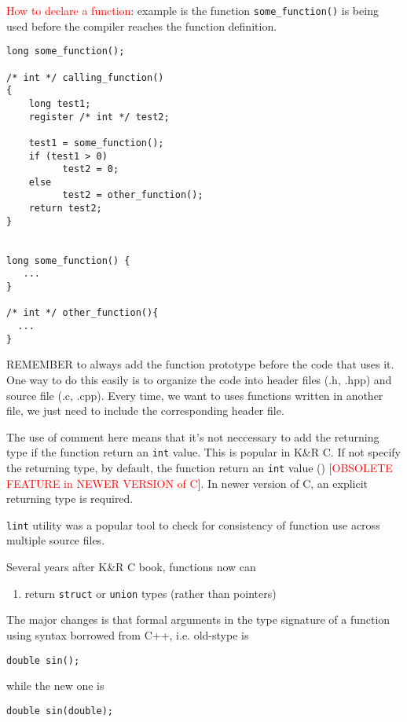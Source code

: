 \textcolor{red}{How to declare a function}: example is the function
\verb!some_function()! is being used before the compiler reaches the function
definition. 
\begin{lstlisting}
long some_function();

/* int */ calling_function()
{
    long test1;
    register /* int */ test2;
 
    test1 = some_function();
    if (test1 > 0)
          test2 = 0;
    else
          test2 = other_function();
    return test2;
}


long some_function() {
   ... 
}

/* int */ other_function(){
  ...
}
\end{lstlisting}
REMEMBER to always add the function prototype before the code that
uses it. One way to do this easily is to organize the code into header
files (.h, .hpp) and source file (.c, .cpp). Every time, we want to uses
functions written in another file, we just need to include the corresponding
header file.

The use of comment here means that it's not neccessary to add the returning type
if the function return an \verb!int! value. This is popular in K\&R C. If not
specify the returning type, by default, the function return an \verb!int! value
() [\textcolor{red}{OBSOLETE FEATURE in NEWER VERSION of C}].
In newer version of C, an explicit returning type is required.

\begin{mdframed}
\verb!lint! utility was a popular tool to check for consistency of function use
across multiple source files.
\end{mdframed}

Several years after K\&R C book, functions now can 
\begin{enumerate}
  \item return \verb!struct! or \verb!union! types (rather than pointers)
\end{enumerate}

The major changes is that formal arguments in the type signature of a function
using syntax borrowed from C++, i.e. old-stype is
\begin{lstlisting}
double sin();
\end{lstlisting}
while the new one is
\begin{lstlisting}
double sin(double);
\end{lstlisting}

